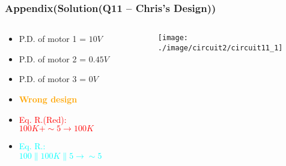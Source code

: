 \documentclass{beamer}
\newcommand{\red}[1]{\textcolor{red}{#1}}
\newcommand{\orange}[1]{\textcolor{orange}{#1}}
\newcommand{\cyan}[1]{\textcolor{cyan}{#1}}
\begin{document}

\begin{frame}
\frametitle{Appendix(Solution(Q11 -- Chris's Design))}
\begin{columns}
\begin{column}{6.5cm}
\begin{itemize} \itemsep1pt \parskip0pt 
  \item[] P.D. of motor 1 = $10V$
  \item[] P.D. of motor 2 = $0.45V$
  \item[] P.D. of motor 3 = $0V$
  \item[] \orange{\bf Wrong design}
\end{itemize}

\begin{itemize} \itemsep1pt \parskip0pt 
  \item[] \red{Eq. R.(Red): $100K + \sim 5 \rightarrow 100K$}
  \item[] \cyan{Eq. R.: $100 \parallel 100K \parallel 5 \rightarrow \sim 5$}
\end{itemize}
\end{column}


\begin{column}{5.5cm}
\begin{figure}[H]
  \centering
  \texttt{[image: ./image/circuit2/circuit11\_1]}
\end{figure}
\end{column}
\end{columns}

\end{frame}

\end{document}
